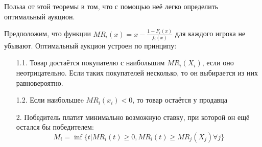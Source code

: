 Польза от этой теоремы в том, что с помощью неё легко определить оптимальный аукцион.


\begin{myth}
Предположим, что функции $ MR_{i}(x)=x-\frac{1-F_{i}(x)}{f_{i}(x)} $ для каждого игрока не убывают. Оптимальный аукцион устроен по принципу:
\begin{itemize}
\item[1.1.] Товар достаётся покупателю с наибольшим $ MR_{i}(X_{i}) $, если оно неотрицательно. Если таких покупателей несколько, то он выбирается из них равновероятно.
\item[1.2.] Если наибольшеe $ MR_{i}(x_{i})<0 $, то товар остаётся у продавца
\item[2.] Победитель платит минимально возможную ставку, при которой он ещё остался бы победителем:
\begin{equation}
M_{i}=\inf\{ t| MR_{i}(t)\geq 0 , MR_{i}(t)\geq MR_{j}(X_{j}) \forall j \}
\end{equation}
\end{itemize}
\end{myth}

